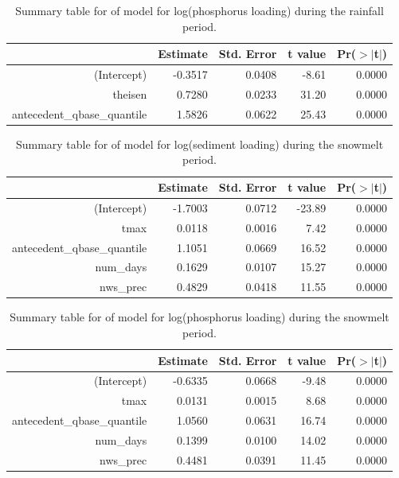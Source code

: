 \documentclass[10pt]{article}
\begin{document}
\begin{table}[ht]
\begin{center}
\begin{tabular}{rrrrr}
  \hline
 & Estimate & Std. Error & t value & Pr($>$$|$t$|$) \\ 
  \hline
(Intercept) & -0.3517 & 0.0408 & -8.61 & 0.0000 \\ 
  theisen & 0.7280 & 0.0233 & 31.20 & 0.0000 \\ 
  antecedent\_qbase\_quantile & 1.5826 & 0.0622 & 25.43 & 0.0000 \\ 
   \hline
\end{tabular}
\caption{Summary table for of model for log(phosphorus loading) during the rainfall period.}
\end{center}
\end{table}

\begin{table}[ht]
\begin{center}
\begin{tabular}{rrrrr}
  \hline
 & Estimate & Std. Error & t value & Pr($>$$|$t$|$) \\ 
  \hline
(Intercept) & -1.7003 & 0.0712 & -23.89 & 0.0000 \\ 
  tmax & 0.0118 & 0.0016 & 7.42 & 0.0000 \\ 
  antecedent\_qbase\_quantile & 1.1051 & 0.0669 & 16.52 & 0.0000 \\ 
  num\_days & 0.1629 & 0.0107 & 15.27 & 0.0000 \\ 
  nws\_prec & 0.4829 & 0.0418 & 11.55 & 0.0000 \\ 
   \hline
\end{tabular}
\caption{Summary table for of model for log(sediment loading) during the snowmelt period.}
\end{center}
\end{table}

\begin{table}[ht]
\begin{center}
\begin{tabular}{rrrrr}
  \hline
 & Estimate & Std. Error & t value & Pr($>$$|$t$|$) \\ 
  \hline
(Intercept) & -0.6335 & 0.0668 & -9.48 & 0.0000 \\ 
  tmax & 0.0131 & 0.0015 & 8.68 & 0.0000 \\ 
  antecedent\_qbase\_quantile & 1.0560 & 0.0631 & 16.74 & 0.0000 \\ 
  num\_days & 0.1399 & 0.0100 & 14.02 & 0.0000 \\ 
  nws\_prec & 0.4481 & 0.0391 & 11.45 & 0.0000 \\ 
   \hline
\end{tabular}
\caption{Summary table for of model for log(phosphorus loading) during the snowmelt period.}
\end{center}
\end{table}
\end{document}

